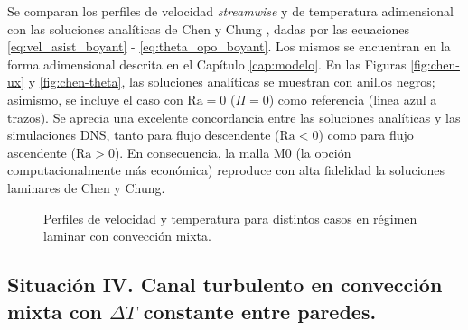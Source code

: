 Se comparan los perfiles de velocidad \textit{streamwise} y de temperatura adimensional con las soluciones analíticas de Chen y Chung \cite{chen1996linear}, dadas por las ecuaciones \ref{eq:vel_asist_boyant} - \ref{eq:theta_opo_boyant}. Los mismos se encuentran en la forma adimensional descrita en el Capítulo \ref{cap:modelo}. En las Figuras \ref{fig:chen-ux} y \ref{fig:chen-theta}, las soluciones analíticas se muestran con anillos negros; asimismo, se incluye el caso con $\text{Ra}=0$ ($\Pi=0$) como referencia (linea azul a trazos). Se aprecia una excelente concordancia entre las soluciones analíticas y las simulaciones DNS, tanto para flujo descendente ($\text{Ra}<0$) como para flujo ascendente ($\text{Ra}>0$). En consecuencia, la malla M0 (la opción computacionalmente más económica) reproduce con alta fidelidad la soluciones laminares de Chen y Chung. 

\begin{figure}[H]
 \centering
 \caption{Perfiles de velocidad y temperatura para distintos casos en régimen laminar con convección mixta.} 
 \label{fig:chen-profiles}
\end{figure}


\subsection{Situación IV. Canal turbulento en convección mixta con $\Delta T$ constante entre paredes.}

